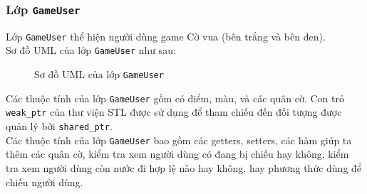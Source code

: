 \subsubsection{Lớp \lstinline{GameUser}}
Lớp \lstinline{GameUser} thể hiện người dùng game Cờ vua (bên trắng và bên đen).\\
Sơ đồ UML của lớp \lstinline{GameUser} như sau:
\begin{figure}[H]
\caption{Sơ đồ UML của lớp \lstinline{GameUser}}
\end{figure}
Các thuộc tính của lớp \lstinline{GameUser} gồm có điểm, màu, và các quân cờ. Con trỏ \lstinline{weak_ptr} của thư viện STL được sử dụng để tham chiếu đến đối tượng được quản lý bởi \lstinline{shared_ptr}.\\
Các thuộc tính của lớp \lstinline{GameUser} bao gồm các getters, setters, các hàm giúp ta thêm các quân cờ, kiểm tra xem người dùng có đang bị chiếu hay không, kiểm tra xem người dùng còn nước đi hợp lệ nào hay không, hay phương thức dùng để chiếu người dùng.

